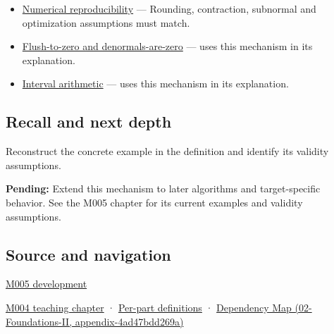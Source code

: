 \begin{itemize}
\item
  \hyperref[appendix-5f1a2c3f97ff]{Numerical reproducibility} --- Rounding, contraction, subnormal and optimization assumptions must match.
\item
  \hyperref[appendix-e979eb012782]{Flush-to-zero and denormals-are-zero} --- uses this mechanism in its explanation.
\item
  \hyperref[appendix-1823a14330cb]{Interval arithmetic} --- uses this mechanism in its explanation.
\end{itemize}

\subsection{Recall and next depth}\label{appendix-f11d1a521253-recall-and-next-depth}

Reconstruct the concrete example in the definition and identify its validity assumptions.

\textbf{Pending:} Extend this mechanism to later algorithms and target-specific behavior. See the M005 chapter for its current examples and validity assumptions.

\subsection{Source and navigation}\label{appendix-f11d1a521253-source-and-navigation}

\hyperref[01-foundations-i-ch001-when-arithmetic-meets-uncertainty]{M005 development}

\hyperref[01-foundations-i-ch001-a-stretching-ruler-for-real-valued-quantities]{M004 teaching chapter} · \hyperref[appendix-fd090d982a15-m004---parts-61-76]{Per-part definitions} · \href{../02-Foundations-II/main.pdf\#nameddest=appendix-4ad47bdd269a}{Dependency Map (02-Foundations-II, appendix-4ad47bdd269a)}
